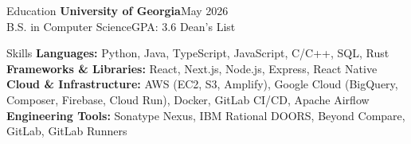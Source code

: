 \address{(678) 677-1014\quad\textbar\quad
  \href{mailto:ryan1130124@gmail.com}{ryan1130124@gmail.com}\quad\textbar\quad
  \href{https://RyanMajd.com}{RyanMajd.com}\quad\textbar\quad
  \href{https://www.linkedin.com/in/Ryan-Majd}{linkedin.com/in/Ryan-Majd}}



\begin{rSection}{Education}
    \textbf{University of Georgia}\hfill May 2026\\
    B.S. in Computer Science\hfill GPA: 3.6 \textbar{} Dean's List
\end{rSection}

\begin{rSection}{Skills}
    \textbf{Languages:} Python, Java, TypeScript, JavaScript, C/C++, SQL, Rust\\
    \textbf{Frameworks \& Libraries:} React, Next.js, Node.js, Express, React Native\\
    \textbf{Cloud \& Infrastructure:} AWS (EC2, S3, Amplify), Google Cloud (BigQuery, Composer, Firebase, Cloud Run), Docker, GitLab CI/CD, Apache Airflow\\
    \textbf{Engineering Tools:} Sonatype Nexus, IBM Rational DOORS, Beyond Compare, GitLab, GitLab Runners
\end{rSection}
